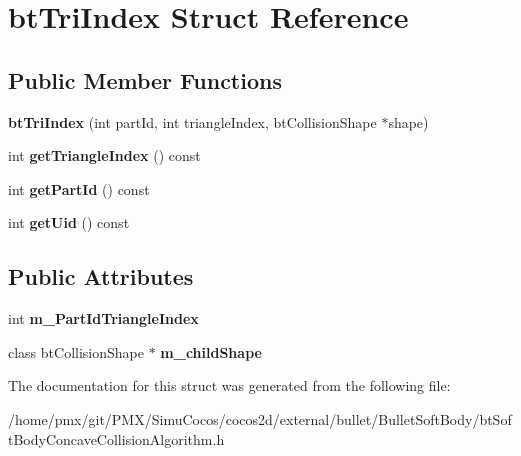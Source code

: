 \hypertarget{structbtTriIndex}{}\section{bt\+Tri\+Index Struct Reference}
\label{structbtTriIndex}
\subsection*{Public Member Functions}
\begin{DoxyCompactItemize}
\item 
\mbox{\label{structbtTriIndex_acd3cb31e57c199688fc52514739ade2f}} 
{\bfseries bt\+Tri\+Index} (int part\+Id, int triangle\+Index, bt\+Collision\+Shape $\ast$shape)
\item 
\mbox{\label{structbtTriIndex_a98f904364e75303a484bec68376bb448}} 
int {\bfseries get\+Triangle\+Index} () const
\item 
\mbox{\label{structbtTriIndex_a8c50c076471b3fa155edec25d56f3ddf}} 
int {\bfseries get\+Part\+Id} () const
\item 
\mbox{\label{structbtTriIndex_a124b543d2d0fe6d0ac5393428ffcccf1}} 
int {\bfseries get\+Uid} () const
\end{DoxyCompactItemize}
\subsection*{Public Attributes}
\begin{DoxyCompactItemize}
\item 
\mbox{\label{structbtTriIndex_acd9ff9834da232fbec86aba2067c18ad}} 
int {\bfseries m\+\_\+\+Part\+Id\+Triangle\+Index}
\item 
\mbox{\label{structbtTriIndex_abb7205518a0f9cd64d0131a734a12a5a}} 
class bt\+Collision\+Shape $\ast$ {\bfseries m\+\_\+child\+Shape}
\end{DoxyCompactItemize}


The documentation for this struct was generated from the following file\+:\begin{DoxyCompactItemize}
\item 
/home/pmx/git/\+P\+M\+X/\+Simu\+Cocos/cocos2d/external/bullet/\+Bullet\+Soft\+Body/bt\+Soft\+Body\+Concave\+Collision\+Algorithm.\+h\end{DoxyCompactItemize}
